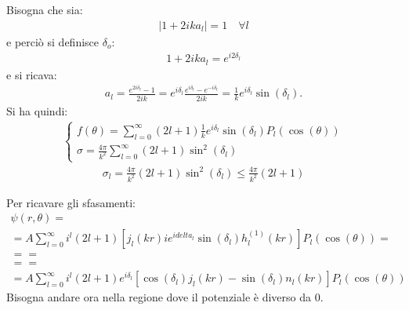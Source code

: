 Bisogna che sia:
\begin{equation}\begin{split}
\left|1+2ika_l\right|=1\quad \forall l
\end{split}\end{equation}
e perciò si definisce $\delta_o$:
\begin{equation}\begin{split}
1+2ika_l=e^{i2\delta_l}
\end{split}\end{equation}
e si ricava:
\begin{equation}\begin{split}
a_l=\frac{e^{2i\delta_l}-1}{2ik}=e^{i\delta_l}\frac{e^{i\delta_l}-e^{-i\delta_l}}{2ik}=\frac{1}{k}e^{i\delta_l}\sin{\left(\delta_l\right)}.
\end{split}\end{equation}
Si ha quindi:
\begin{equation}\begin{split}
\begin{cases}
f\left(\theta\right)=\sum_{l=0}^{\infty }{\left(2l+1\right)\frac{1}{k}e^{i\delta_l}\sin{\left(\delta_l\right)}P_l\left(\cos{\left(\theta\right)}\right)}\\
\sigma=\frac{4\pi}{k^2}\sum_{l=0}^{\infty }{\left(2l+1\right)\sin^2{\left(\delta_l\right)}}
\end{cases}
\end{split}\end{equation}
\begin{equation}\begin{split}
\sigma_l=\frac{4\pi}{k^2}\left(2l+1\right)\sin^2{\left(\delta_l\right)}\le \frac{4\pi}{k^2}\left(2l+1\right)
\end{split}\end{equation}

Per ricavare gli sfasamenti:
\begin{equation}\begin{split}
\psi\left(r,\theta\right) =\\
=A\sum_{l=0}^{\infty }{i^l\left(2l+1\right)\left[j_l\left(kr\right)ie^{idelta_l}\sin{\left(\delta_l\right)}h^{\left(1\right)}_l\left(kr\right)\right]P_l\left(\cos{\left(\theta\right)}\right)}=\\
= =\\
= =\\
=A\sum_{l=0}^{\infty }{i^l\left(2l+1\right)e^{i\delta_l}\left[\cos{\left(\delta_l\right)}j_l\left(kr\right)-\sin{\left(\delta_l\right)}n_l\left(kr\right)\right]P_l\left(\cos{\left(\theta\right)}\right)}
\end{split}\end{equation}
Bisogna andare ora nella regione dove il potenziale è diverso da $0$.

